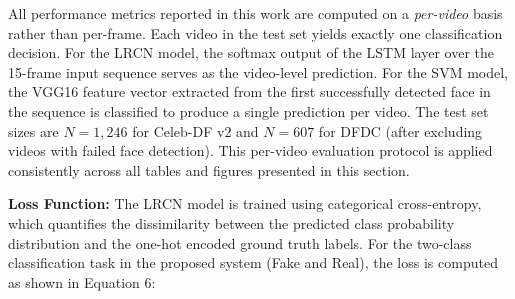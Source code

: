 
All performance metrics reported in this work are computed on a \textit{per-video} basis rather than per-frame. Each video in the test set yields exactly one classification decision. For the LRCN model, the softmax output of the LSTM layer over the 15-frame input sequence serves as the video-level prediction. For the SVM model, the VGG16 feature vector extracted from the first successfully detected face in the sequence is classified to produce a single prediction per video. The test set sizes are $N = 1{,}246$ for Celeb-DF v2 and $N = 607$ for DFDC (after excluding videos with failed face detection). This per-video evaluation protocol is applied consistently across all tables and figures presented in this section.

\vspace{3mm}



%
%


\textbf{Loss Function:} The LRCN model is trained using categorical cross-entropy, which quantifies the dissimilarity between the predicted class probability distribution and the one-hot encoded ground truth labels. For the two-class classification task in the proposed system (Fake and Real), the loss is computed as shown in Equation 6:

\vspace{5mm}

